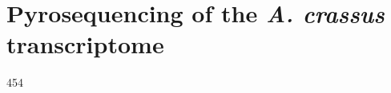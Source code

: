 
\chapter{Pyrosequencing of the \textit{A. crassus}
  transcriptome} %



\ifpdf
    \graphicspath{{X/figures/PNG/}{X/figures/PDF/}{X/figures/}}
\else
    \graphicspath{{X/figures/EPS/}{X/figures/}}
\fi


454 






